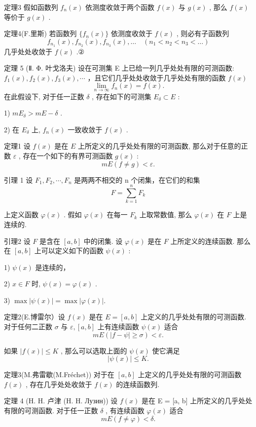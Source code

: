 \documentclass[]{article}
\begin{document}
定理3 假如函数列 $f_{n}(x)$ 依测度收敛于两个函数 $f(x)$ 与 $g(x)$ , 那么 $f(x)$ 等价于 $g(x)$ . 

定理4(F.里斯) 若函数列 $\{f_n(x)\}$ 依测度收敛于 $f(x)$ , 则必有子函数列 $$
f _ {n _ {1}} (x), f _ {n _ {2}} (x), f _ {n _ {3}} (x), \dots \quad (n _ {1} <   n _ {2} <   n _ {3} <   \dots)
$$几乎处处收敛于 $f(x)$ .② 

定理 5 (Ⅱ. Φ. 叶戈洛夫) 设在可测集 E 上已给一列几乎处处有限的可测函数: $f_{1}(x), f_{2}(x), f_{3}(x), \cdots$ ，且它们几乎处处收敛于几乎处处有限的函数 $f(x)$ $$
\lim _ {n \to \infty} f _ {n} (x) = f (x). \tag {*}
$$在此假设下, 对于任一正数 $\delta$ , 存在如下的可测集 $E_{\delta} \subset E$ :

1) $mE_{\delta} > mE - \delta$ . 

2) 在 $E_{\delta}$ 上, $f_{n}(x)$ 一致收敛于 $f(x)$ .

定理1 设 $f(x)$ 是在 $E$ 上所定义的几乎处处有限的可测函数, 那么对于任意的正数 $\varepsilon$ , 存在一个如下的有界可测函数 $g(x)$ :$$
m E (f \neq g) <   \varepsilon .
$$

引理 1 设 $F_{1}, F_{2}, \cdots, F_{n}$ 是两两不相交的 n 个闭集，在它们的和集 $$
F = \sum_ {k = 1} ^ {n} F _ {k}
$$

上定义函数 $\varphi(x)$ . 假如 $\varphi(x)$ 在每一 $F_{k}$ 上取常数值, 那么 $\varphi(x)$ 在 $F$ 上是连续的. 

引理2 设 $F$ 是含在 $[a, b]$ 中的闭集. 设 $\varphi(x)$ 是在 $F$ 上所定义的连续函数. 那么在 $[a, b]$ 上可以定义如下的函数 $\psi(x)$ :   

1) $\psi(x)$ 是连续的， 

2) $x \in F$ 时, $\psi(x) = \varphi(x)$ . 

3) $\max |\psi (x)| = \max |\varphi (x)|.$ 

定理2(E.博雷尔）设 $f(x)$ 是在 $E = [a,b]$ 上定义的几乎处处有限的可测函数.对于任何二正数 $\sigma$ 与 $\varepsilon ,[a,b]$ 上有连续函数 $\psi (x)$ 适合 $$
m E (| f - \psi | \geqslant \sigma) <   \varepsilon .
$$

如果 $|f(x)| \leqslant K$ , 那么可以选取上面的 $\psi(x)$ 使它满足$$
| \psi (x) | \leqslant K.
$$

定理3(M.弗雷歇(M.Fréchet)) 对于在 $[a,b]$ 上定义的几乎处处有限的可测函数 $f(x)$ , 存在几乎处处收敛于 $f(x)$ 的连续函数列. 

定理 4 (H. H. 卢津 (H. H. Лузин)) 设 $f(x)$ 是在 E = [a, b] 上所定义的几乎处处有限的可测函数. 对于任一正数 $\delta$ , 有连续函数 $\varphi(x)$ 适合  $$
m E (f \neq \varphi) <   \delta .
$$
\end{document}

